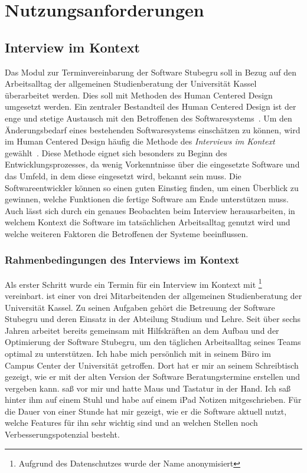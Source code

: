 \chapter{Nutzungsanforderungen}
\label{chapter:user-requirements}

\section{Interview im Kontext}
\label{subsection:IIK}

Das Modul zur Terminvereinbarung der Software Stubegru soll in Bezug auf den
Arbeitsalltag der allgemeinen Studienberatung der Universität Kassel
überarbeitet werden. Dies soll mit Methoden des Human Centered Design umgesetzt
werden. Ein zentraler Bestandteil des Human Centered Design ist der enge und
stetige Austausch mit den Betroffenen des Softwaresystems~\cite{hci}. Um den
Änderungsbedarf eines bestehenden Softwaresystems einschätzen zu können, wird im
Human Centered Design häufig die Methode des \textit{Interviews im Kontext}
gewählt~\cite{contextualDesign}. Diese Methode eignet sich besonders zu Beginn
des Entwicklungsprozesses, da wenig Vorkenntnisse über die eingesetzte Software
und das Umfeld, in dem diese eingesetzt wird, bekannt sein muss. Die
Softwareentwickler können so einen guten Einstieg finden, um einen Überblick zu
gewinnen, welche Funktionen die fertige Software am Ende unterstützen muss.
Auch lässt sich durch ein genaues Beobachten beim Interview herausarbeiten, in
welchem Kontext die Software im tatsächlichen Arbeitsalltag genutzt wird und
welche weiteren Faktoren die Betroffenen der Systeme beeinflussen.

\subsection*{Rahmenbedingungen des Interviews im Kontext}
Als erster Schritt wurde ein Termin für ein Interview im Kontext mit
\ipName\footnote{Aufgrund des Datenschutzes wurde der Name anonymisiert}
vereinbart. \ipName ist einer von drei Mitarbeitenden der allgemeinen
Studienberatung der Universität Kassel. Zu seinen Aufgaben gehört die Betreuung
der Software Stubegru und deren Einsatz in der Abteilung Studium und Lehre.
Seit über sechs Jahren arbeitet \ipName bereits gemeinsam mit Hilfskräften an
dem Aufbau und der Optimierung der Software Stubegru, um den täglichen
Arbeitsalltag seines Teams optimal zu unterstützen. Ich habe mich persönlich
mit \ipName in seinem Büro im Campus Center der Universität getroffen. Dort hat
er mir an seinem Schreibtisch gezeigt, wie er mit der alten Version der
Software Beratungstermine erstellen und vergeben kann. \ipName saß vor mir und
hatte Maus und Tastatur in der Hand. Ich saß hinter ihm auf einem Stuhl und
habe auf einem iPad Notizen mitgeschrieben. Für die Dauer von einer Stunde hat
\ipName mir gezeigt, wie er die Software aktuell nutzt, welche Features für ihn
sehr wichtig sind und an welchen Stellen noch Verbesserungspotenzial besteht.

